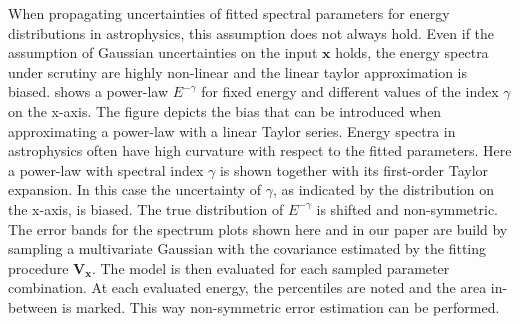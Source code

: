 When propagating uncertainties of fitted spectral parameters for energy distributions in astrophysics, this assumption does not always hold. 
Even if the assumption of Gaussian uncertainties on the input $\mathbf{x}$ holds, the energy spectra under scrutiny are highly non-linear and the 
linear taylor approximation is biased. 
 shows a power-law $E^{-\gamma}$ for fixed energy and different values of the index $\gamma$ on the x-axis.
The figure depicts the bias that can be introduced when approximating a power-law with a linear Taylor series.
Energy spectra in astrophysics often have high curvature with respect to the fitted parameters.
Here a power-law with spectral index $\gamma$ is shown together with its first-order Taylor expansion.
In this case the uncertainty of $\gamma$, as indicated by the distribution on the x-axis, is biased.  
The true distribution of $E^{-\gamma}$ is shifted and non-symmetric. 
The error bands for the spectrum plots shown here and in our paper are build by sampling 
a multivariate Gaussian with the covariance estimated by the fitting procedure $\mathbf{V_{\mathbf{x}}}$. The model is then 
evaluated for each sampled parameter combination. At each evaluated energy, the percentiles are noted and the area in-between is marked.
This way non-symmetric error estimation can be performed.

